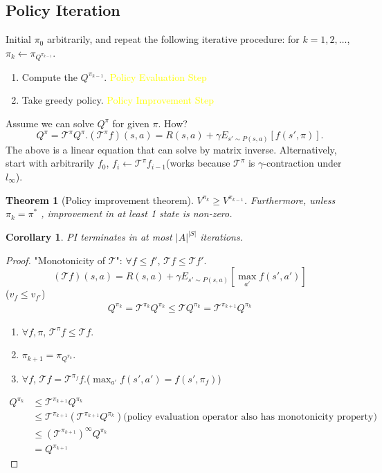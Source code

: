 \documentclass{report}
\newtheorem{theorem}{Theorem}[section]
\newtheorem{corollary}{Corollary}[theorem]
\begin{document}
\subsection{Policy Iteration}
Initial $\pi_0$ arbitrarily, and repeat the following iterative procedure: for $k=1,2,\hdots$, $\pi_k \leftarrow \pi_{Q^{\pi_{k-1}}}$.
\begin{enumerate}
    \item Compute the $Q^{\pi_{k-1}}$. \textcolor{yellow}{Policy Evaluation Step}
    \item Take greedy policy. \textcolor{yellow}{Policy Improvement Step}
\end{enumerate}
Assume we can solve $Q^{\pi}$ for given $\pi$. How?
\[
Q^{\pi}=\mathcal{T}^{\pi}Q^{\pi}. (\mathcal{T}^{\pi}f)(s,a)=R(s,a)+\gamma E_{s'\sim P(s,a)}[f(s',\pi)].
\]
The above is a linear equation that can solve by matrix inverse. Alternatively, start with arbitrarily $f_0$, $f_i \leftarrow \mathcal{T}^{\pi}f_{i-1}$(works because $\mathcal{T}^{\pi}$ is $\gamma$-contraction under $l_{\infty}$).
\begin{theorem}[Policy improvement theorem]
 $V^{\pi_k} \geq V^{\pi_{k-1}}$. Furthermore, unless $\pi_k=\pi^*$ , improvement in at least 1 state is non-zero.
\end{theorem}
\begin{corollary}
PI terminates in at most $|A|^{|S|}$ iterations.
\end{corollary}
\begin{proof}
    "Monotonicity of $\mathcal{T}$": $\forall f \leq f'$, $\mathcal{T}f \leq \mathcal{T}f'$.\[
        (\mathcal{T}f)(s,a)=R(s,a)+\gamma E_{s'\sim P(s,a)}[\max_{a'}f(s',a')]
    \]
    ($v_f \leq v_{f'}$)\\ 
    \begin{equation*}
        \begin{split}
            Q^{\pi_k}=\mathcal{T}^{\pi_k}Q^{\pi_k}\leq \mathcal{T}Q^{\pi_k}=\mathcal{T}^{\pi_{k+1}}Q^{\pi_k}
        \end{split}
    \end{equation*}
    \begin{enumerate}
        \item $\forall f,\pi$, $\mathcal{T}^{\pi}f \leq \mathcal{T}f$.
        \item $\pi_{k+1}=\pi_{Q^{\pi_k}}$.
        \item $\forall f$, $\mathcal{T}f=\mathcal{T}^{\pi_f}f$.($\max_{a'}f(s',a')=f(s',\pi_f)$)
    \end{enumerate}
    \begin{equation*}
        \begin{split}
            Q^{\pi_k} &\leq \mathcal{T}^{\pi_{k+1}}Q^{\pi_k} \\
            & \leq \mathcal{T}^{\pi_{k+1}}(\mathcal{T}^{\pi_{k+1}}Q^{\pi_k}) \text{(policy evaluation operator also has monotonicity property)}\\
            & \leq (\mathcal{T}^{\pi_{k+1}})^{\infty}Q^{\pi_k} \\
            & = Q^{\pi_{k+1}}
        \end{split}
    \end{equation*}
\end{proof}
\end{document}
